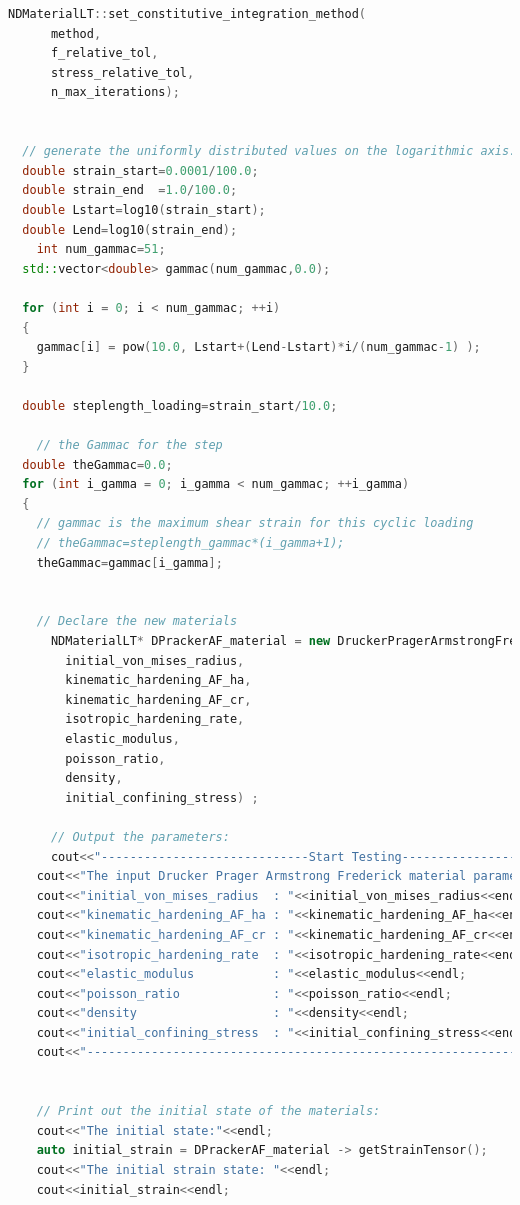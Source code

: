 \documentclass[fleqn,11pt]{article}
\begin{document}
\begin{lstlisting}[language=C++, frame=single]
    NDMaterialLT::set_constitutive_integration_method(
      method,
      f_relative_tol,
      stress_relative_tol,
      n_max_iterations);

    
  // generate the uniformly distributed values on the logarithmic axis. 
  double strain_start=0.0001/100.0;
  double strain_end  =1.0/100.0;
  double Lstart=log10(strain_start);
  double Lend=log10(strain_end);
    int num_gammac=51;
  std::vector<double> gammac(num_gammac,0.0);

  for (int i = 0; i < num_gammac; ++i)
  {
    gammac[i] = pow(10.0, Lstart+(Lend-Lstart)*i/(num_gammac-1) );
  }
  
  double steplength_loading=strain_start/10.0;

    // the Gammac for the step
  double theGammac=0.0;
  for (int i_gamma = 0; i_gamma < num_gammac; ++i_gamma)
  {
    // gammac is the maximum shear strain for this cyclic loading
    // theGammac=steplength_gammac*(i_gamma+1);
    theGammac=gammac[i_gamma];

    
    // Declare the new materials
      NDMaterialLT* DPrackerAF_material = new DruckerPragerArmstrongFrederick( material_tag,
        initial_von_mises_radius,
        kinematic_hardening_AF_ha,
        kinematic_hardening_AF_cr,
        isotropic_hardening_rate,
        elastic_modulus,
        poisson_ratio,
        density,
        initial_confining_stress) ;

      // Output the parameters:
      cout<<"-----------------------------Start Testing----------------------------"<<endl;
    cout<<"The input Drucker Prager Armstrong Frederick material parameters:"<<endl;
    cout<<"initial_von_mises_radius  : "<<initial_von_mises_radius<<endl;
    cout<<"kinematic_hardening_AF_ha : "<<kinematic_hardening_AF_ha<<endl;
    cout<<"kinematic_hardening_AF_cr : "<<kinematic_hardening_AF_cr<<endl;
    cout<<"isotropic_hardening_rate  : "<<isotropic_hardening_rate<<endl;
    cout<<"elastic_modulus           : "<<elastic_modulus<<endl;
    cout<<"poisson_ratio             : "<<poisson_ratio<<endl;
    cout<<"density                   : "<<density<<endl;
    cout<<"initial_confining_stress  : "<<initial_confining_stress<<endl;
    cout<<"-----------------------------------------------------------------------"<<endl;

    
    // Print out the initial state of the materials:
    cout<<"The initial state:"<<endl;
    auto initial_strain = DPrackerAF_material -> getStrainTensor();
    cout<<"The initial strain state: "<<endl;
    cout<<initial_strain<<endl;


\end{lstlisting}
\end{document}
